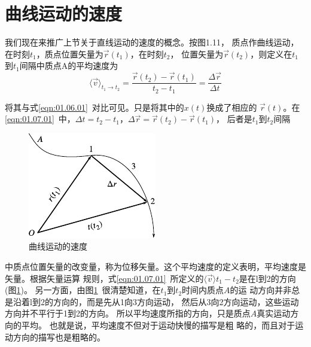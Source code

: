 \section{曲线运动的速度}\label{sec:01.07}

我们现在来推广上节关于直线运动的速度的概念。按图1.11，
质点作曲线运动，在时刻$t_1$，质点位置矢量为$\vec{r}\left(t_1\right)$，在时刻$t_2$，
位置矢量为$\vec{r}\left(t_2\right)$，则定义在$t_1$到$t_1$间隔中质点A的平均速度为
\begin{equation}\label{eqn:01.07.01}
  \langle \vec{v} \rangle_{t_1\rightarrow t_2}=\frac{\vec{r}\left(t_2\right)-\vec{r}\left(t_1\right)}{t_2-t_1}=\frac{\Delta \vec{r}}{\Delta t}
\end{equation}

\noindent 将其与式\eqref{eqn:01.06.01}~对比可见。只是将其中的$x\left(t\right)$换成了相应的
$\vec{r}\left(t\right)$。在\eqref{eqn:01.07.01}~中，$\Delta t=t_2-t_1$，$\Delta \vec{r}=\vec{r}\left(t_2\right)-\vec{r}\left(t_1\right)$，
后者是$t_1$到$t_2$间隔
\begin{figure}
  \centering
  \small
  \includegraphics{figure/fig01.11}
  \caption{曲线运动的速度}
  \label{fig:01.11}
\end{figure}
中质点位置矢量的改变量，称为位移矢量。这个平均速度的定义表明，平均速度是矢量。根据矢量运算
规则，式\eqref{eqn:01.07.01}~所定义的$\langle \vec{v}\rangle t_1-t_2$是在l到2的方向(图\ref{fig:01.11})。
另一方面，由图\ref{fig:01.11}~很清楚知道，在$t_1$到$t_2$时间内质点$A$的运
动方向并非总是沿着l到2的方向的，而是先从1向3方向运动，
然后从3向2方向运动，这些运动方向并不平行于1到2的方向。
所以平均速度所指的方向，只是质点$A$真实运动方向的平均。
也就是说，平均速度不但对于运动快慢的描写是粗
略的，而且对于运动方向的描写也是粗略的。

